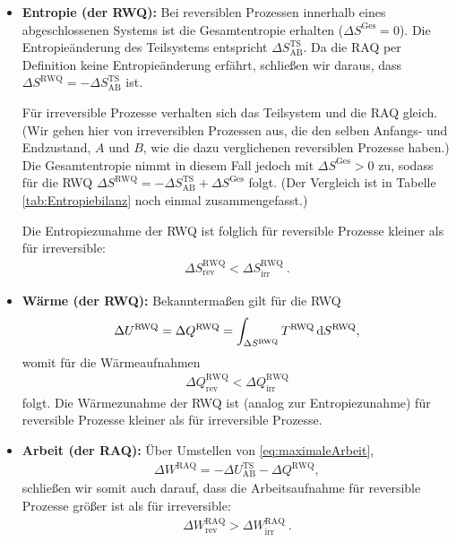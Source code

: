 \begin{itemize}
    \item \textbf{Entropie (der RWQ):} Bei reversiblen Prozessen innerhalb eines abgeschlossenen Systems ist die Gesamtentropie erhalten ($\Delta S^\mathrm{Ges}=0$). Die Entropieänderung des Teilsystems entspricht $\Delta S^{\mathrm{TS}}_{\mathrm{AB}}$. Da die RAQ per Definition keine Entropieänderung erfährt, schließen wir daraus, dass $\Delta S^\mathrm{RWQ}=-\Delta S^{\mathrm{TS}}_\mathrm{AB}$ ist.
    
    Für irreversible Prozesse verhalten sich das Teilsystem und die RAQ gleich. (Wir gehen hier von irreversiblen Prozessen aus, die den selben Anfangs- und Endzustand, $A$ und $B$, wie die dazu verglichenen reversiblen Prozesse haben.)
    Die Gesamtentropie nimmt in diesem Fall jedoch mit $\Delta S^\mathrm{Ges}>0$ zu, sodass für die RWQ $\Delta S^\mathrm{RWQ}=-\Delta S^{\mathrm{TS}}_\mathrm{AB}+\Delta S^\mathrm{Ges}$ folgt.
    (Der Vergleich ist in Tabelle \ref{tab:Entropiebilanz} noch einmal zusammengefasst.) 

    Die Entropiezunahme der RWQ ist folglich für reversible Prozesse kleiner als für irreversible:
    \begin{align*}
        \boxed{\Delta S^\mathrm{RWQ}_\mathrm{rev}<\Delta S^\mathrm{RWQ}_\mathrm{irr}}\:.
    \end{align*}
    
    \item \textbf{Wärme (der RWQ):} Bekanntermaßen gilt für die RWQ 
    \begin{align*}
        \Delta U^\mathrm{RWQ}=\Delta Q^\mathrm{RWQ}=\int_{\Delta S^\mathrm{RWQ}}T^\mathrm{RWQ}\mathop{}\!\mathrm{d} S^\mathrm{RWQ},
    \end{align*}
    womit für die Wärmeaufnahmen 
    \begin{align*}
        \boxed{\Delta Q_\mathrm{rev}^\mathrm{RWQ}<\Delta Q_\mathrm{irr}^\mathrm{RWQ}}
    \end{align*}
    folgt. Die Wärmezunahme der RWQ ist (analog zur Entropiezunahme) für reversible Prozesse kleiner als für irreversible Prozesse.
    \item \textbf{Arbeit (der RAQ):} Über Umstellen von \ref{eq:maximaleArbeit},
    \begin{align*}
        \Delta W^\mathrm{RAQ}=-\Delta U_\mathrm{AB}^\mathrm{TS}-\Delta Q^\mathrm{RWQ},
    \end{align*}
    schließen wir somit auch darauf, dass die Arbeitsaufnahme für reversible Prozesse größer ist als für irreversible:
    \begin{align*}
        \boxed{\Delta W^\mathrm{RAQ}_\mathrm{rev}>\Delta W^\mathrm{RAQ}_\mathrm{irr}}\:.
    \end{align*}
\end{itemize} 
